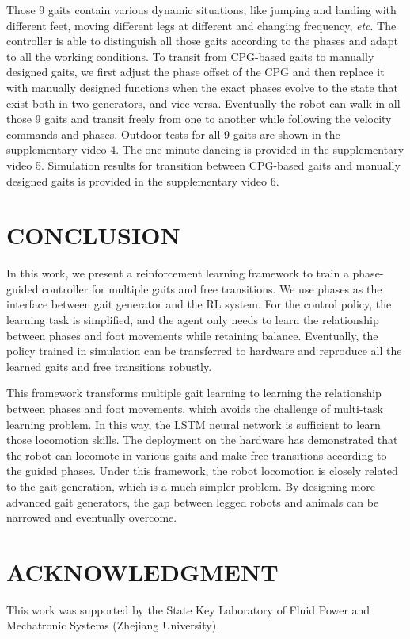\documentclass[letterpaper, 10 pt, journal, twoside]{IEEEtran} %
\begin{document}
Those 9 gaits contain various dynamic situations, like jumping and landing with different feet, moving different legs at different and changing frequency, \textit{etc}. The controller is able to distinguish all those gaits according to the phases and adapt to all the working conditions. To transit from CPG-based gaits to manually designed gaits, we first adjust the phase offset of the CPG and then replace it with manually designed functions when the exact phases evolve to the state that exist both in two generators, and vice versa. Eventually the robot can walk in all those 9 gaits and transit freely from one to another while following the velocity commands and phases. Outdoor tests for all 9 gaits are shown in the supplementary video 4. The one-minute dancing is provided in the supplementary video 5. Simulation results for transition between CPG-based gaits and manually designed gaits is provided in the supplementary video 6.

\section{CONCLUSION}
In this work, we present a reinforcement learning framework to train a phase-guided controller for multiple gaits and free transitions. We use phases as the interface between gait generator and the RL system. For the control policy, the learning task is simplified, and the agent only needs to learn the relationship between phases and foot movements while retaining balance. Eventually, the policy trained in simulation can be transferred to hardware and reproduce all the learned gaits and free transitions robustly.

This framework transforms multiple gait learning to learning the relationship between phases and foot movements, which avoids the challenge of multi-task learning problem. In this way, the LSTM neural network is sufficient to learn those locomotion skills. The deployment on the hardware has demonstrated that the robot can locomote in various gaits and make free transitions according to the guided phases. Under this framework, the robot locomotion is closely related to the gait generation, which is a much simpler problem. By designing more advanced gait generators, the gap between legged robots and animals can be narrowed and eventually overcome.

\section*{ACKNOWLEDGMENT}
This work was supported by the State Key Laboratory of Fluid Power and Mechatronic Systems (Zhejiang University).



\end{document}
